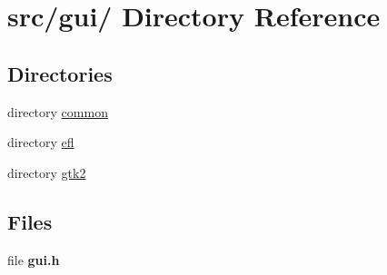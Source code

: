 \hypertarget{dir_000001}{
\section{src/gui/ Directory Reference}
\label{dir_000001}
}
\subsection*{Directories}
\begin{CompactItemize}
\item 
directory \hyperlink{dir_000005}{common}
\item 
directory \hyperlink{dir_000012}{efl}
\item 
directory \hyperlink{dir_000002}{gtk2}
\end{CompactItemize}
\subsection*{Files}
\begin{CompactItemize}
\item 
file {\bf gui.h}
\end{CompactItemize}
